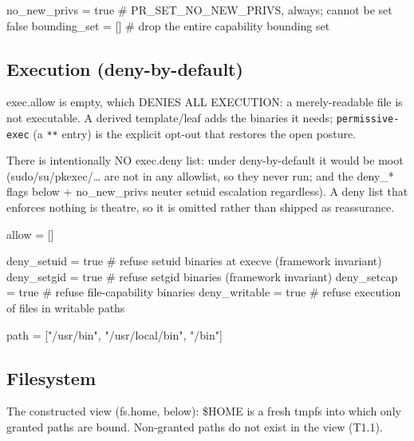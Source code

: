 \begin{kennelcode}
[cap]
no_new_privs = true        # PR_SET_NO_NEW_PRIVS, always; cannot be set false
bounding_set = []          # drop the entire capability bounding set
\end{kennelcode}

\hypertarget{execution-deny-by-default}{%
\subsection{Execution
(deny-by-default)}\label{execution-deny-by-default}}

exec.allow is empty, which DENIES ALL EXECUTION: a merely-readable file
is not executable. A derived template/leaf adds the binaries it needs;
\texttt{permissive-exec} (a \texttt{**} entry) is the explicit opt-out
that restores the open posture.

There is intentionally NO exec.deny list: under deny-by-default it would
be moot (sudo/su/pkexec/\ldots{} are not in any allowlist, so they never
run; and the deny\_* flags below + no\_new\_privs neuter setuid
escalation regardless). A deny list that enforces nothing is theatre, so
it is omitted rather than shipped as reassurance.

\begin{kennelcode}
[exec]
allow = []
\end{kennelcode}

\begin{kennelcode}
deny_setuid = true         # refuse setuid binaries at execve (framework invariant)
deny_setgid = true         # refuse setgid binaries (framework invariant)
deny_setcap = true         # refuse file-capability binaries
deny_writable = true       # refuse execution of files in writable paths
\end{kennelcode}

\begin{kennelcode}
path = ["/usr/bin", "/usr/local/bin", "/bin"]
\end{kennelcode}

\hypertarget{filesystem}{%
\subsection{Filesystem}\label{filesystem}}

The constructed view (fs.home, below): \$HOME is a fresh tmpfs into
which only granted paths are bound. Non-granted paths do not exist in
the view (T1.1).

